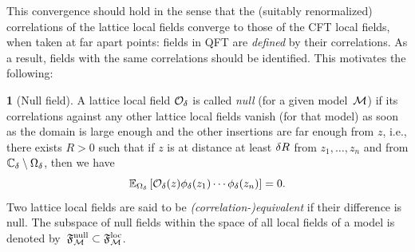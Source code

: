 \documentclass[12pt,oneside,english]{amsart}
\numberwithin{equation}{section}
\numberwithin{figure}{section}
\theoremstyle{plain}
\theoremstyle{plain}
\theoremstyle{plain}
\theoremstyle{plain}
\theoremstyle{remark}
\theoremstyle{definition}
\newtheorem{defn}[thm]{\protect\definitionname}
\theoremstyle{plain}
\theoremstyle{plain}
\numberwithin{thm}{section}
\newcommand{\kallemod}[1]{{\color{kallecol} {#1}}}
\providecommand{\definitionname}{Definition}
\providecommand{\definitionname}{Definition}
\providecommand{\definitionname}{Definition}
\providecommand{\definitionname}{Definition}
\begin{document}
This convergence should hold in the sense that the (suitably renormalized)
correlations of the lattice local fields converge to those of the
CFT local fields, when taken at far apart points: fields in QFT are
\emph{defined} by their correlations. As a result, fields with the
same correlations should be identified. This motivates the following: 
\begin{defn}[Null field]
\label{def:null-lattice-local-field}
A lattice local field $ {\mathcal{O}}_{ {\delta}}$
is called \emph{null} (for a given model~$\mathcal{M}$) if its correlations 
against
any other lattice local fields vanish (for that model) as soon as
the domain is large enough and the other insertions are far enough
from $z$, i.e.,
there exists $R>0$ such that if $z$ is at distance at least ${\delta} 
R$ from $z_{1}, \ldots, z_{n}$ and from ${\mathbb{C}_{{\delta}}} \setminus {{\Omega}}_{{\delta}}$, then we have
\[
\mathbb{E}_{{{\Omega}}_{{\delta}}}\left[ {\mathcal{O}}_{ {\delta}}(z) 
  {\phi}_{ {\delta}}(z_{1}) \cdots 
  {\phi}_{ {\delta}}(z_{n}) \right]
= 0 .
\]
Two lattice local fields are said to be \emph{(correlation-)equivalent}
if their difference is null.
The subspace of null fields within the space %
of all local fields 
of a model is denoted by~$\mathfrak{F}^\mathrm{null}_{\mathcal{M}} \subset \mathfrak{F}^\mathrm{loc}_{\mathcal{M}}$.
\end{defn}
\end{document}
